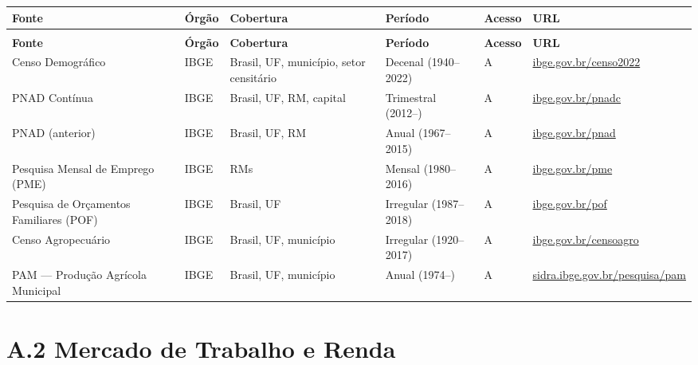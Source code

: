 {\setlength{\tabcolsep}{3pt}\footnotesize\begin{longtable}{@{} >{\raggedright\arraybackslash}p{2.9cm} >{\raggedright\arraybackslash}p{2.3cm} >{\raggedright\arraybackslash}p{2.4cm} >{\raggedright\arraybackslash}p{2.4cm} >{\raggedright\arraybackslash}p{1.1cm} >{\raggedright\arraybackslash}p{3.2cm} @{}}
\toprule
\textbf{Fonte} & \textbf{Órgão} & \textbf{Cobertura} & \textbf{Período} & \textbf{Acesso} & \textbf{URL} \\
\midrule
\endfirsthead
\multicolumn{6}{l}{\small\textit{(continuação)}} \\
\toprule
\textbf{Fonte} & \textbf{Órgão} & \textbf{Cobertura} & \textbf{Período} & \textbf{Acesso} & \textbf{URL} \\
\midrule
\endhead
\bottomrule
\endfoot

Censo Demográfico
  & IBGE
  & Brasil, UF, município, setor censitário
  & Decenal (1940--2022)
  & A
  & \url{ibge.gov.br/censo2022} \\

PNAD Contínua
  & IBGE
  & Brasil, UF, RM, capital
  & Trimestral (2012--)
  & A
  & \url{ibge.gov.br/pnadc} \\

PNAD (anterior)
  & IBGE
  & Brasil, UF, RM
  & Anual (1967--2015)
  & A
  & \url{ibge.gov.br/pnad} \\

Pesquisa Mensal de Emprego (PME)
  & IBGE
  & 6 RMs
  & Mensal (1980--2016)
  & A
  & \url{ibge.gov.br/pme} \\

Pesquisa de Orçamentos Familiares (POF)
  & IBGE
  & Brasil, UF
  & Irregular (1987--2018)
  & A
  & \url{ibge.gov.br/pof} \\

Censo Agropecuário
  & IBGE
  & Brasil, UF, município
  & Irregular (1920--2017)
  & A
  & \url{ibge.gov.br/censoagro} \\

PAM --- Produção Agrícola Municipal
  & IBGE
  & Brasil, UF, município
  & Anual (1974--)
  & A
  & \url{sidra.ibge.gov.br/pesquisa/pam} \\

\end{longtable}}

\section*{A.2 Mercado de Trabalho e Renda}

